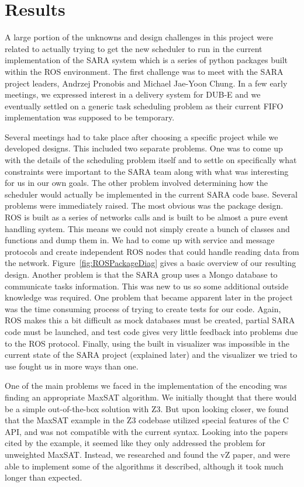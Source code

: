 \documentclass{article}
\begin{document}
\section{Results}
A large portion of the unknowns and design challenges in this project were related to actually trying to get the new scheduler to run in the current implementation of the SARA system which is a series of python packages built within the ROS environment. The first challenge was to meet with the SARA project leaders, Andrzej Pronobis and Michael Jae-Yoon Chung. In a few early meetings, we expressed interest in a delivery system for DUB-E and we eventually settled on a generic task scheduling problem as their current FIFO implementation was supposed to be temporary.

Several meetings had to take place after choosing a specific project while we developed designs. This included two separate problems. One was to come up with the details of the scheduling problem itself and to settle on specifically what constraints were important to the SARA team along with what was interesting for us in our own goals. The other problem involved determining how the scheduler would actually be implemented in the current SARA code base. Several problems were immediately raised. The most obvious was the package design. ROS is built as a series of networks calls and is built to be almost a pure event handling system. This means we could not simply create a bunch of classes and functions and dump them in. We had to come up with service and message protocols and create independent ROS nodes that could handle reading data from the network. Figure~\ref{fig:ROSPackageDiag} gives a basic overview of our resulting design. Another problem is that the SARA group uses a Mongo database to communicate tasks information. This was new to us so some additional outside knowledge was required. One problem that became apparent later in the project was the time consuming process of trying to create tests for our code. Again, ROS makes this a bit difficult as mock databases must be created, partial SARA code must be launched, and test code gives very little feedback into problems due to the ROS protocol. Finally, using the built in visualizer was impossible in the current state of the SARA project (explained later) and the visualizer we tried to use fought us in more ways than one.

One of the main problems we faced
in the implementation of the encoding
was finding an appropriate MaxSAT algorithm.
We initially thought that there would be a simple
out-of-the-box solution with Z3.
But upon looking closer,
we found that the MaxSAT example
in the Z3 codebase
utilized special features of the C API,
and was not compatible with the current syntax.
Looking into the papers cited by the example,
it seemed like they only addressed the problem
for unweighted MaxSAT.
Instead, we researched and found the vZ paper,
and were able to implement some of the algorithms
it described,
although it took much longer than expected.
\end{document}
